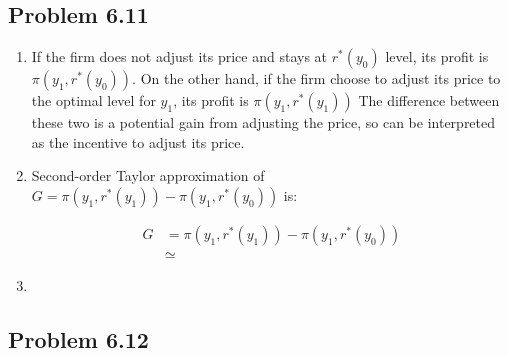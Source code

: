 \documentclass[11pt]{amsart}
\begin{document}
\subsection{Problem 6.11}
\begin{enumerate}[label = (\alph*)]
	\item If the firm does not adjust its price and stays at $r^{*}(y_0)$ level, its profit is $\pi \left( y_1, r^{*}(y_0)  \right)$. On the other hand, if the firm choose to adjust its price to the optimal level for $y_1$, its profit is $\pi \left( y_1, r^{*}(y_1)  \right)$ The difference between these two is a potential gain from adjusting the price, so can be interpreted as the incentive to adjust its price. 
	\item Second-order Taylor approximation of $G = \pi \left( y_1, r^{*}(y_1)  \right) - \pi \left( y_1, r^{*}(y_0)  \right)$ is: 
	
	\begin{align*}
	G &= \pi \left( y_1, r^{*}(y_1)  \right) - \pi \left( y_1, r^{*}(y_0)  \right) \\
	 & \simeq 
	\end{align*}
	\item 
\end{enumerate}
\subsection{Problem 6.12}
\end{document}
